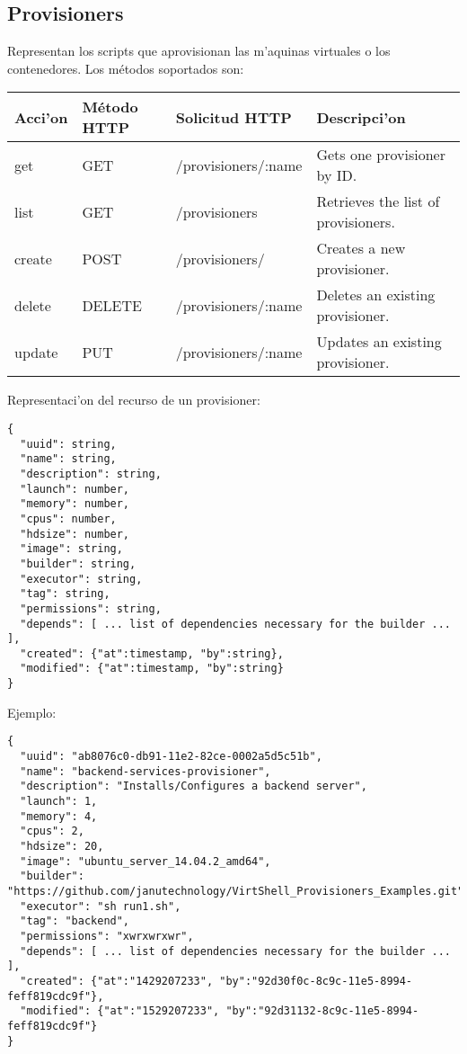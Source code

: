 \subsection{Provisioners}
Representan los scripts que aprovisionan las m'aquinas virtuales o los contenedores. Los métodos soportados son:

\begin{center}
 \begin{tabular}{| l | l | l | l |}
 \hline
  \rowcolor{blueapi}
  \textbf{Acci'on} & \textbf{Método HTTP} & \textbf{Solicitud HTTP} & \textbf{Descripci'on} \\ [0.5ex] 
  \hline\hline
  get & GET & /provisioners/:name & Gets one provisioner by ID. \\
  \hline
  list & GET & /provisioners & Retrieves the list of provisioners. \\
  \hline  
  create & POST & /provisioners/ & Creates a new provisioner. \\
  \hline
  delete & DELETE & /provisioners/:name & Deletes an existing provisioner. \\
  \hline  
  update & PUT & /provisioners/:name & Updates an existing provisioner. \\ [1ex] 
  \hline
\end{tabular}
\end{center}

Representaci'on del recurso de un provisioner:

\medskip
\begin{lstlisting}[style=json]
{
  "uuid": string,
  "name": string,
  "description": string,
  "launch": number,
  "memory": number,
  "cpus": number,
  "hdsize": number,
  "image": string,
  "builder": string,
  "executor": string,
  "tag": string,
  "permissions": string,
  "depends": [ ... list of dependencies necessary for the builder ... ],
  "created": {"at":timestamp, "by":string},
  "modified": {"at":timestamp, "by":string}
}

\end{lstlisting}

Ejemplo:

\medskip
\begin{lstlisting}[style=json]
{
  "uuid": "ab8076c0-db91-11e2-82ce-0002a5d5c51b",
  "name": "backend-services-provisioner",
  "description": "Installs/Configures a backend server",
  "launch": 1,
  "memory": 4,
  "cpus": 2,
  "hdsize": 20,
  "image": "ubuntu_server_14.04.2_amd64",
  "builder": "https://github.com/janutechnology/VirtShell_Provisioners_Examples.git",
  "executor": "sh run1.sh",
  "tag": "backend",
  "permissions": "xwrxwrxwr",
  "depends": [ ... list of dependencies necessary for the builder ... ],
  "created": {"at":"1429207233", "by":"92d30f0c-8c9c-11e5-8994-feff819cdc9f"},
  "modified": {"at":"1529207233", "by":"92d31132-8c9c-11e5-8994-feff819cdc9f"}
}
\end{lstlisting}


